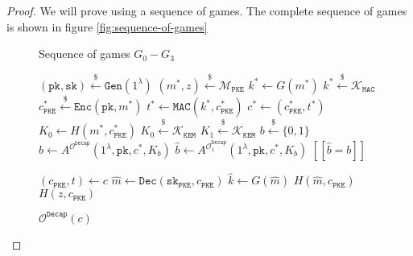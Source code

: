 \documentclass[floatrow,journal=tches,submission]{iacrtrans}
\newcommand{\pke}{\texttt{PKE}}
\newcommand{\keygen}{\texttt{Gen}}
\newcommand{\encrypt}{\texttt{Enc}}
\newcommand{\decrypt}{\texttt{Dec}}
\newcommand{\kem}{\texttt{KEM}}
\newcommand{\decap}{\texttt{Decap}}
\newcommand{\mac}{\texttt{MAC}}
\newcommand{\pk}{\texttt{pk}}
\newcommand{\sk}{\texttt{sk}}
\newcommand{\leftsample}{\stackrel{\$}{\leftarrow}}
\newcommand{\llbrack}{[\![}
\newcommand{\rrbrack}{]\!]}
\begin{document}
\begin{proof}
    We will prove using a sequence of games. The complete sequence of games is shown in figure \ref{fig:sequence-of-games}

    \begin{figure}[H]
        \centering
        \begin{algorithm}[H]
            \caption{Sequence of games $G_0 - G_3$}\label{alg:sequence-of-games}
            \begin{algorithmic}[1]
                \State $(\pk, \sk) \leftsample \keygen(1^\lambda)$
                \State $(m^\ast, z) \leftsample \mathcal{M}_\pke$
                \State $k^\ast \leftarrow G(m^\ast)$
                \State $k^\ast \leftsample \mathcal{K}_\mac$
                \State $c^\ast_\pke \leftsample \encrypt(\pk, m^\ast)$
                \State $t^\ast \leftarrow \mac(k^\ast, c^\ast_\pke)$
                \State $c^\ast \leftarrow (c^\ast_\pke, t^\ast)$
                \State $K_0 \leftarrow H(m^\ast, c^\ast_\pke)$
                \State $K_0 \leftsample \mathcal{K}_\kem$
                \State $K_1 \leftsample \mathcal{K}_\kem$
                \State $b \leftsample \{0,1\}$
                \State $\hat{b} \leftarrow A^{\mathcal{O}^\decap}(
                    1^\lambda, \pk, c^\ast, K_b)$
                \State $\hat{b} \leftarrow A^{\mathcal{O}^\decap_1}(
                    1^\lambda, \pk, c^\ast, K_b)$
                \State \Return $\llbrack \hat{b} = b \rrbrack$
            \end{algorithmic}
        \end{algorithm}
        \begin{algorithm}[H]
            \caption{$\mathcal{O}^\decap(c)$}\label{alg:etm-decap-oracle}
            \begin{algorithmic}[1]
                \State $(c_\pke, t) \leftarrow c$
                \State $\hat{m} \leftarrow \decrypt(\sk_\pke, c_\pke)$
                \State $\hat{k} \leftarrow G(\hat{m})$
                \If{$\mac(\hat{k}, c_\pke) = t$}
                    \State \Return $H(\hat{m}, c_\pke)$
                \EndIf
                \State \Return $H(z, c_\pke)$
            \end{algorithmic}
        \end{algorithm}
        \begin{algorithm}[H]

\end{algorithm}
\end{figure}
\end{proof}
\end{document}
